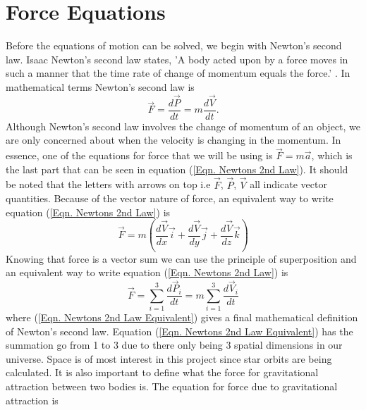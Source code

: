 \documentclass[twocolumn]{article}
\begin{document}
\section{Force Equations}
Before the equations of motion can be solved, we begin with Newton's second law. Isaac Newton's second law states, 'A body acted upon by a force moves in such a manner that the time rate of change of momentum equals the force.' \cite{Marion}. In mathematical terms Newton's second law is
\begin{equation}\label{Eqn. Newtons 2nd Law}
\Vec{F}=\frac{d\Vec{P}}{dt}=m\frac{d\Vec{V}}{dt}.
\end{equation}
Although Newton's second law involves the change of momentum of an object, we are only concerned about when the velocity is changing in the momentum. In essence, one of the equations for force that we will be using is $\Vec{F}=m\Vec{a}$, which is the last part that can be seen in equation (\ref{Eqn. Newtons 2nd Law}). It should be noted that the letters with arrows on top i.e $\Vec{F}$, $\Vec{P}$, $\Vec{V}$ all indicate vector quantities. Because of the vector nature of force, an equivalent way to write equation (\ref{Eqn. Newtons 2nd Law}) is
\begin{equation}\label{Eqn. Newtons 2nd Law Vector}
\Vec{F}=m(\frac{d\Vec{V}}{dx}\Vec{i} + \frac{d\Vec{V}}{dy}\Vec{j} + \frac{d\Vec{V}}{dz}\Vec{k})
\end{equation}
Knowing that force is a vector sum we can use the principle of superposition and an equivalent way to write equation (\ref{Eqn. Newtons 2nd Law}) is
\begin{equation}\label{Eqn. Newtons 2nd Law Equivalent}
\Vec{F}=\sum_{i=1}^{3} \frac{d\Vec{P}_i}{dt}=m\sum_{i=1}^{3} \frac{d\Vec{V}_i}{dt}
\end{equation}
where (\ref{Eqn. Newtons 2nd Law Equivalent}) gives a final mathematical definition of Newton's second law. Equation (\ref{Eqn. Newtons 2nd Law Equivalent}) has the summation go from 1 to 3 due to there only being 3 spatial dimensions in our universe. Space is of most interest in this project since star orbits are being calculated. It is also important to define what the force for gravitational attraction between two bodies is. The equation for force due to gravitational attraction is \cite{Marion}
\end{document}
